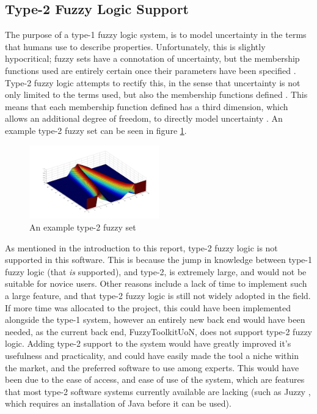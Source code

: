 \subsection{Type-2 Fuzzy Logic Support}
\label{sec:type2}
The purpose of a type-1 fuzzy logic system, is to model uncertainty in the terms that humans use to describe properties. Unfortunately, this is slightly hypocritical; fuzzy sets have a connotation of uncertainty, but the membership functions used are entirely certain once their parameters have been specified \cite{mendel2003type}. Type-2 fuzzy logic attempts to rectify this, in the sense that uncertainty is not only limited to the terms used, but also the membership functions defined \cite{castillo2003type}. This means that each membership function defined has a third dimension, which allows an additional degree of freedom, to directly model uncertainty \cite{mendel2002type}. An example type-2 fuzzy set can be seen in figure \ref{fig:fw-type2}.
\newpage 
\begin{figure}[ht!]
	\begin{center}
		\includegraphics[width=0.5\textwidth]{images/type2set}
	\end{center}
	\vspace{-4mm}
	\caption{An example type-2 fuzzy set}
	\label{fig:fw-type2}
	\vspace{-1mm}
\end{figure}
\noindent
As mentioned in the introduction to this report, type-2 fuzzy logic is not supported in this software. This is because the jump in knowledge between type-1 fuzzy logic (that \emph{is} supported), and type-2, is extremely large, and would not be suitable for novice users. Other reasons include a lack of time to implement such a large feature, and that type-2 fuzzy logic is still not widely adopted in the field. If more time was allocated to the project, this could have been implemented alongside the type-1 system, however an entirely new back end would have been needed, as the current back end, FuzzyToolkitUoN, does not support type-2 fuzzy logic. Adding type-2 support to the system would have greatly improved it's usefulness and practicality, and could have easily made the tool a niche within the market, and the preferred software to use among experts. This would have been due to the ease of access, and ease of use of the system, which are  features that most type-2 software systems currently available are lacking (such as Juzzy \cite{wagner2013juzzy}, which requires an installation of Java before it can be used).

